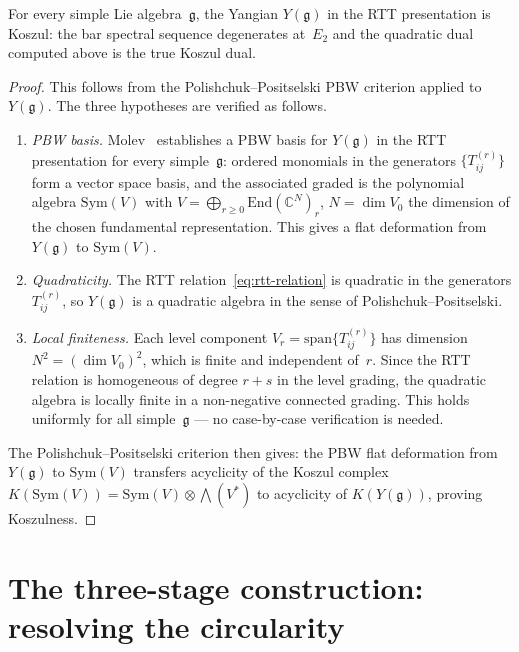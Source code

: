 \begin{proposition}\label{prop:yangian-koszul-general}
For every simple Lie algebra~$\mathfrak{g}$, the Yangian
$Y(\mathfrak{g})$ in the RTT presentation is Koszul: the bar
spectral sequence degenerates at~$E_2$ and the quadratic dual
computed above is the true Koszul dual.
\end{proposition}

\begin{proof}
This follows from the Polishchuk--Positselski PBW criterion
\cite[Ch.~4]{PP05} applied to $Y(\mathfrak{g})$.
The three hypotheses are verified as follows.
\begin{enumerate}
\item \emph{PBW basis.}
  Molev~\cite{molev-yangians} establishes a PBW basis for
  $Y(\mathfrak{g})$ in the RTT presentation for every
  simple~$\mathfrak{g}$: ordered monomials in the generators
  $\{T_{ij}^{(r)}\}$ form a vector space basis, and the associated
  graded is the polynomial algebra $\mathrm{Sym}(V)$ with
  $V = \bigoplus_{r \geq 0} \mathrm{End}(\mathbb{C}^N)_r$,
  $N = \dim V_0$ the dimension of the chosen fundamental
  representation.  This gives a flat deformation from
  $Y(\mathfrak{g})$ to $\mathrm{Sym}(V)$.
\item \emph{Quadraticity.}
  The RTT relation~\eqref{eq:rtt-relation} is quadratic in the
  generators $T_{ij}^{(r)}$, so $Y(\mathfrak{g})$ is a quadratic
  algebra in the sense of Polishchuk--Positselski.
\item \emph{Local finiteness.}
  Each level component $V_r = \mathrm{span}\{T_{ij}^{(r)}\}$
  has dimension $N^2 = (\dim V_0)^2$, which is finite and
  independent of~$r$.  Since the RTT relation is homogeneous of
  degree $r+s$ in the level grading, the quadratic algebra is
  locally finite in a non-negative connected grading.  This holds
  uniformly for all simple~$\mathfrak{g}$ --- no case-by-case
  verification is needed.
\end{enumerate}
The Polishchuk--Positselski criterion then gives: the PBW flat
deformation from $Y(\mathfrak{g})$ to $\mathrm{Sym}(V)$ transfers
acyclicity of the Koszul complex
$K(\mathrm{Sym}(V)) = \mathrm{Sym}(V) \otimes \bigwedge(V^*)$
to acyclicity of $K(Y(\mathfrak{g}))$, proving Koszulness.
\end{proof}


\section{The three-stage construction: resolving the circularity}
\label{sec:three-stage-construction}

